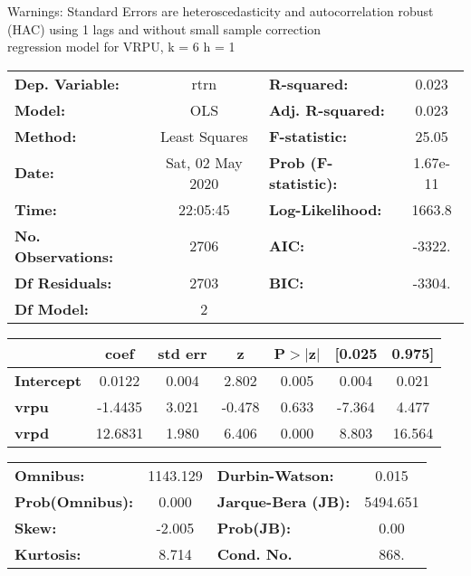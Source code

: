 Warnings: \newline
 [1] Standard Errors are heteroscedasticity and autocorrelation robust (HAC) using 1 lags and without small sample correction\\ 

regression model for VRPU, k = 6 h = 1\begin{center}
\begin{tabular}{lclc}
\toprule
\textbf{Dep. Variable:}    &       rtrn       & \textbf{  R-squared:         } &     0.023   \\
\textbf{Model:}            &       OLS        & \textbf{  Adj. R-squared:    } &     0.023   \\
\textbf{Method:}           &  Least Squares   & \textbf{  F-statistic:       } &     25.05   \\
\textbf{Date:}             & Sat, 02 May 2020 & \textbf{  Prob (F-statistic):} &  1.67e-11   \\
\textbf{Time:}             &     22:05:45     & \textbf{  Log-Likelihood:    } &    1663.8   \\
\textbf{No. Observations:} &        2706      & \textbf{  AIC:               } &    -3322.   \\
\textbf{Df Residuals:}     &        2703      & \textbf{  BIC:               } &    -3304.   \\
\textbf{Df Model:}         &           2      & \textbf{                     } &             \\
\bottomrule
\end{tabular}
\begin{tabular}{lcccccc}
                   & \textbf{coef} & \textbf{std err} & \textbf{z} & \textbf{P$> |$z$|$} & \textbf{[0.025} & \textbf{0.975]}  \\
\midrule
\textbf{Intercept} &       0.0122  &        0.004     &     2.802  &         0.005        &        0.004    &        0.021     \\
\textbf{vrpu}      &      -1.4435  &        3.021     &    -0.478  &         0.633        &       -7.364    &        4.477     \\
\textbf{vrpd}      &      12.6831  &        1.980     &     6.406  &         0.000        &        8.803    &       16.564     \\
\bottomrule
\end{tabular}
\begin{tabular}{lclc}
\textbf{Omnibus:}       & 1143.129 & \textbf{  Durbin-Watson:     } &    0.015  \\
\textbf{Prob(Omnibus):} &   0.000  & \textbf{  Jarque-Bera (JB):  } & 5494.651  \\
\textbf{Skew:}          &  -2.005  & \textbf{  Prob(JB):          } &     0.00  \\
\textbf{Kurtosis:}      &   8.714  & \textbf{  Cond. No.          } &     868.  \\
\bottomrule
\end{tabular}
\end{center}


